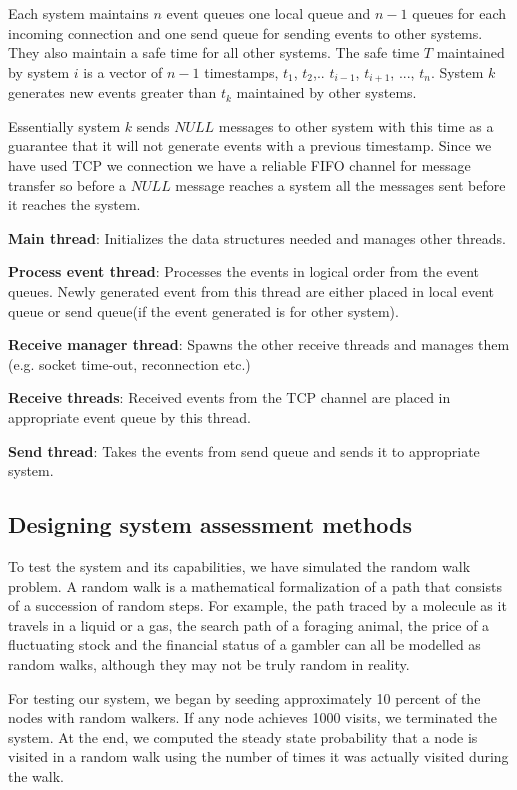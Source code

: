 \documentclass[12pt,a4paper]{article}
\begin{document}
Each system maintains $n$ event queues one local queue and $n-1$ queues for each incoming connection and one send queue for sending events to other systems. They also maintain a safe time for all other systems. The safe time $T$ maintained by system $i$ is a vector of $n-1$ timestamps, $t_1$, $t_2$,.. $t_{i-1}$, $t_{i+1}$, ..., $t_n$. System $k$ generates new events greater than $t_k$ maintained by other systems.

Essentially system $k$ sends $NULL$ messages to other system with this time as a guarantee that it will not generate events with a previous timestamp. Since we have used TCP we connection we have a reliable FIFO channel for message transfer so before a $NULL$ message reaches a system all the messages sent before it reaches the system.

\textbf{Main thread}: Initializes the data structures needed and manages other threads.

\textbf{Process event thread}: Processes the events in logical order from the event queues. Newly generated event from this thread are either placed in local event queue or send queue(if the event generated is for other system).

\textbf{Receive manager thread}: Spawns the other receive threads and manages them (e.g. socket time-out, reconnection etc.)

\textbf{Receive threads}: Received events from the TCP channel are placed in appropriate event queue by this thread.

\textbf{Send thread}: Takes the events from send queue and sends it to appropriate system.
	\subsection{Designing system assessment methods}
To test the system and its capabilities, we have simulated the random walk problem. A random walk is a mathematical formalization of a path that consists of a succession of random steps. For example, the path traced by a molecule as it travels in a liquid or a gas, the search path of a foraging animal, the price of a fluctuating stock and the financial status of a gambler can all be modelled as random walks, although they may not be truly random in reality.

For testing our system, we began by seeding approximately 10 percent of the nodes with random walkers. If any node achieves 1000 visits, we terminated the system. At the end, we computed the steady state probability that a node is visited in a random walk using the number of times it was actually visited during the walk.
\end{document}
